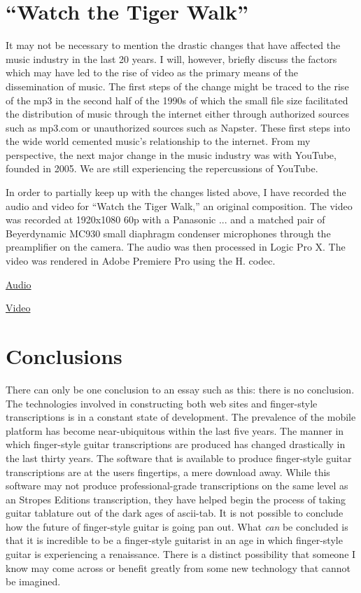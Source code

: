\documentclass[unicode,hyperfootnotes=false,xetex,colorlinks=true,nofonts,nobib]{tufte-handout}
\begin{document}
\section{``Watch the Tiger Walk''}
\label{sec:watch-tiger-walk}

It may not be necessary to mention the drastic changes that have affected the music industry in the last 20 years. I will, however, briefly discuss the factors which may have led to the rise of video as the primary means of the dissemination of music. The first steps of the change might be traced to the rise of the mp3 in the second half of the 1990s of which the small file size facilitated the distribution of music through the internet either through authorized sources such as mp3.com or unauthorized sources such as Napster. These first steps into the wide world cemented music's relationship to the internet. From my perspective, the next major change in the music industry was with YouTube, founded in 2005. We are still experiencing the repercussions of YouTube.

In order to partially keep up with the changes listed above, I have recorded the audio and video for ``Watch the Tiger Walk,'' an original composition. The video was recorded at {\numberfont1920x1080 60p} with a Panasonic ... and a matched pair of Beyerdynamic {\numberfont MC930} small diaphragm condenser microphones through the preamplifier on the camera. The audio was then processed in Logic Pro X. The video was rendered in Adobe Premiere Pro using the H. {} codec.

\noindent \href{run:Road.mp3}{Audio}

\noindent\href{run:creativeCommons.mp4}{Video}

\section{Conclusions}
\label{sec:conclusions}

There can only be one conclusion to an essay such as this: there is no conclusion. The technologies involved in constructing both web sites and finger-style transcriptions is in a constant state of development. The prevalence of the mobile platform has become near-ubiquitous within the last five years. The manner in which finger-style guitar transcriptions are produced has changed drastically in the last thirty years. The software that is available to produce finger-style guitar transcriptions are at the users fingertips, a mere download away. While this software may not produce professional-grade transcriptions on the same level as an Stropes Editions transcription, they have helped begin the process of taking guitar tablature out of the dark ages of ascii-tab. It is not possible to conclude how the future of finger-style guitar is going pan out. What \emph{can} be concluded is that it is incredible to be a finger-style guitarist in an age in which finger-style guitar is experiencing a renaissance. There is a distinct possibility that someone I know may come across or benefit greatly from some new technology that cannot be imagined.
\end{document}
